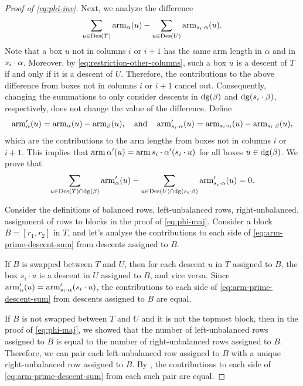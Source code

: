 \begin{proof}[Proof of \eqref{eq:phi-inv}]
    Next, we analyze the difference
    \begin{equation*}
        \sum_{u \in \Des(T)} \arm_{\alpha}(u)
        - \sum_{u \in \Des(U)} \arm_{s_i \permact \alpha}(u).
    \end{equation*}
    Note that a box \(u\) not in columns \(i\) or \(i+1\) has the same arm length in \(\alpha\) and in \(s_i \cdot \alpha\).
    Moreover, by \eqref{eq:restriction-other-columns}, such a box \(u\) is a descent of \(T\) if and only if it is a descent of \(U\).
    Therefore, the contributions to the above difference from boxes not in columns \(i\) or \(i+1\) cancel out.
    Consequently, changing the summations to only consider descents in \(\dg(\beta)\) and \(\dg(s_i \cdot \beta)\), respectively, does not change the value of the difference.
    Define
    \begin{equation*}
        \operatorname{arm}_{\alpha}'(u) = \operatorname{arm}_{\alpha}(u) - \operatorname{arm}_{\beta}(u),
        \quad\text{and}\quad
        \operatorname{arm}_{s_i \cdot \alpha}'(u) = \operatorname{arm}_{s_i \cdot \alpha}(u) - \operatorname{arm}_{s_i \cdot \beta}(u),
    \end{equation*}
    which are the contributions to the arm lengths from boxes not in columns \(i\) or \(i+1\).
    This implies that \(\operatorname{arm}{\alpha}'(u) = \operatorname{arm}{s_i \cdot \alpha}'(s_i \cdot u)\) for all boxes \(u \in \dg(\beta)\).
    We prove that 
    \begin{equation} \label{eq:arm-prime-descent-sum}
        \sum_{u \in \Des(T) \cap \dg(\beta)} \arm_{\alpha}'(u)
        -
        \sum_{u \in \Des(U) \cap \dg(s_i \cdot \beta)} \arm_{s_i \permact \alpha}'(u)
        = 0.
    \end{equation}

    Consider the definitions of balanced rows, left-unbalanced rows, right-unbalanced, assignment of rows to blocks in the proof of \eqref{eq:phi-maj}.
    Consider a block \(B = [r_1, r_2]\) in \(T\), and let's analyse the contributions to each side of \eqref{eq:arm-prime-descent-sum} from descents assigned to \(B\).

    If \(B\) is swapped between \(T\) and \(U\),
    then for each descent \(u\) in \(T\) assigned to \(B\), the box \(s_i \cdot u\) is a descent in \(U\) assigned to \(B\), and vice versa.
    Since \(\operatorname{arm}_{\alpha}'(u) = \operatorname{arm}_{s_i \cdot \alpha}'(s_i \cdot u)\),
    the contributions to each side of \eqref{eq:arm-prime-descent-sum} from descents assigned to \(B\) are equal.

    If \(B\) is not swapped between \(T\) and \(U\) and it is not the topmost block,
    then in the proof of \eqref{eq:phi-maj}, we showed that the number of left-unbalanced rows assigned to \(B\) is equal to the number of right-unbalanced rows assigned to \(B\).
    Therefore, we can pair each left-unbalanced row assigned to \(B\) with a unique right-unbalanced row assigned to \(B\).
    By ,
    the contributions to each side of \eqref{eq:arm-prime-descent-sum} from each such pair are equal.


\end{proof}
